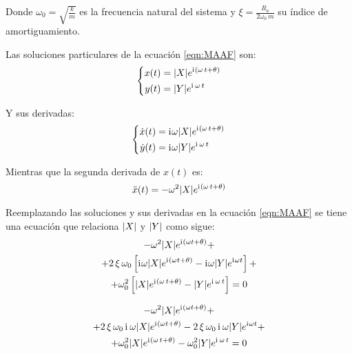 \documentclass[a5paper,12pt,twoside]{book}
\begin{document}
Donde $\omega_0=\sqrt{\frac{k}{m}}$ es la frecuencia natural del sistema y $\xi=\tfrac{R_a}{2\omega_0\,m}$ su índice de amortiguamiento.

Las soluciones particulares de la ecuación \ref{eqn:MAAF} son:
\begin{equation*}
    \left\{
    \begin{aligned}
        x(t) &= {\left| {X} \right|} e^{\mathrm{i}\mkern1mu (\omega \, t + \theta)}
        \\
        y(t) &= {\left| {Y} \right|} e^{\mathrm{i}\mkern1mu \, \omega \, t}
    \end{aligned}
    \right.
\end{equation*}

Y sus derivadas:
\begin{equation*}
    \left\{
    \begin{aligned}
        \Dot{x}(t) &= \mathrm{i}\mkern1mu \omega {\left| {X} \right|} e^{\mathrm{i}\mkern1mu (\omega \, t + \theta)}
        \\
        \Dot{y}(t) &= \mathrm{i}\mkern1mu \omega {\left| {Y} \right|} e^{\mathrm{i}\mkern1mu \, \omega \, t}
    \end{aligned}
    \right.
\end{equation*}

Mientras que la segunda derivada de $x(t)$ es:
\begin{equation*}
    \Ddot{x}(t) = -\omega^2 {\left| {X} \right|} e^{\mathrm{i}\mkern1mu (\omega \, t + \theta)}
\end{equation*}

Reemplazando las soluciones y sus derivadas en la ecuación \ref{eqn:MAAF} se tiene una ecuación que relaciona ${\left| {X} \right|}$ y ${\left| {Y} \right|}$ como sigue:
\begin{multline*}
    -\omega^2 {\left| {X} \right|} e^{\mathrm{i}\mkern1mu (\omega t + \theta)} +
    \\
    + 2 \, \xi \, \omega_0 \left[ \mathrm{i}\mkern1mu \omega {\left| {X} \right|} e^{\mathrm{i}\mkern1mu (\omega t + \theta)} - \mathrm{i}\mkern1mu \omega {\left| {Y} \right|} e^{\mathrm{i}\mkern1mu \omega t} \right] +
    \\
    + \omega_0^2 \left[ {\left| {X} \right|} e^{\mathrm{i}\mkern1mu (\omega \, t + \theta)} - {\left| {Y} \right|} e^{\mathrm{i}\mkern1mu \, \omega \, t} \right] = 0
\end{multline*}

\begin{multline*}
    -\omega^2 {\left| {X} \right|} e^{\mathrm{i}\mkern1mu (\omega t + \theta)} +
    \\
    + 2 \, \xi \, \omega_0 \, \mathrm{i}\mkern1mu \, \omega {\left| {X} \right|} e^{\mathrm{i}\mkern1mu (\omega t + \theta)} - 2 \, \xi \, \omega_0 \, \mathrm{i}\mkern1mu \, \omega {\left| {Y} \right|} e^{\mathrm{i}\mkern1mu \omega t} +
    \\
    + \omega_0^2 {\left| {X} \right|} e^{\mathrm{i}\mkern1mu (\omega \, t + \theta)} - \omega_0^2 {\left| {Y} \right|} e^{\mathrm{i}\mkern1mu \, \omega \, t} = 0
\end{multline*}
\end{document}
